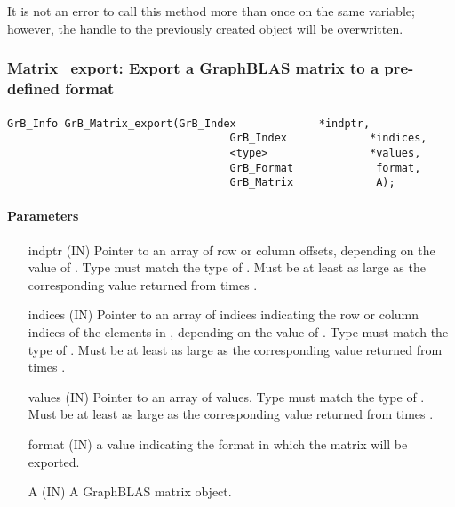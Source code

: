 It is not an error to call this method more than once on the same variable;  
however, the handle to the previously created object will be overwritten. 


\subsubsection{{\sf Matrix\_export}: Export a GraphBLAS matrix to a pre-defined format}
\label{Sec:Matrix_export}

\paragraph{\syntax}

\begin{Verbatim}[samepage=true]    
        GrB_Info GrB_Matrix_export(GrB_Index             *indptr,
                                   GrB_Index             *indices,
                                   <type>                *values,
                                   GrB_Format             format,
                                   GrB_Matrix             A);
\end{Verbatim}

\paragraph{Parameters}

\begin{itemize}[leftmargin=1.1in]
    \item[{\sf indptr}] ({\sf IN}) Pointer to an array of row or column offsets, depending on the value of .  Type must match the type of .  Must be at least as large as the corresponding value returned from  times .
    \item[{\sf indices}] ({\sf IN}) Pointer to an array of indices indicating the row or column indices of the elements in , depending on the value of .  Type must match the type of .  Must be at least as large as the corresponding value returned from  times .
    \item[{\sf values}] ({\sf IN}) Pointer to an array of values.  Type must match the type of .  Must be at least as large as the corresponding value returned from  times .
    \item[{\sf format}] ({\sf IN}) a value indicating the format in which the matrix will be exported.
    \item[{\sf A}]      ({\sf IN}) A GraphBLAS matrix object.
\end{itemize}

